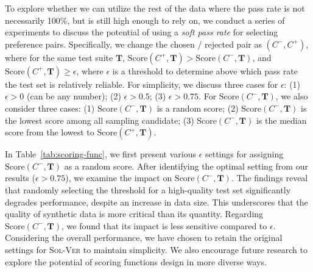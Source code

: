 To explore whether we can utilize the rest of the data where the pass rate is not necessarily 100\%, but is still high enough to rely on, we conduct a series of experiments to discuss the potential of using a \textit{soft pass rate} for selecting preference pairs. Specifically, we change the chosen / rejected pair as $(C^-, C^+)$, where for the same test suite $\mathbf{T}$, $\text{Score}(C^+, \mathbf{T}) > \text{Score}(C^-, \mathbf{T})$, and $\text{Score}(C^+, \mathbf{T}) \geq \epsilon$, where $\epsilon$ is a threshold to determine above which pass rate the test set is relatively reliable. For simplicity, we discuss three cases for $\epsilon$: (1) $\epsilon > 0$ (can be any number); (2) $\epsilon > 0.5$; (3) $\epsilon > 0.75$. For $\text{Score}(C^-, \mathbf{T})$, we also consider three cases: (1) $\text{Score}(C^-, \mathbf{T})$ is a random score; (2) $\text{Score}(C^-, \mathbf{T})$ is the lowest score among all sampling candidate; (3) $\text{Score}(C^-, \mathbf{T})$ is the median score from the lowest to $\text{Score}(C^+, \mathbf{T})$.

In Table~\ref{tab:scoring-func}, we first present various $\epsilon$ settings for assigning $\text{Score}(C^-, \mathbf{T})$ as a random score. After identifying the optimal setting from our results ($\epsilon > 0.75$), we examine the impact on $\text{Score}(C^-, \mathbf{T})$. The findings reveal that randomly selecting the threshold for a high-quality test set significantly degrades performance, despite an increase in data size. This underscores that the quality of synthetic data is more critical than its quantity. Regarding $\text{Score}(C^-, \mathbf{T})$, we found that its impact is less sensitive compared to $\epsilon$. Considering the overall performance, we have chosen to retain the original settings for \textsc{Sol-Ver} to maintain simplicity. We also encourage future research to explore the potential of scoring functions design in more diverse ways.
